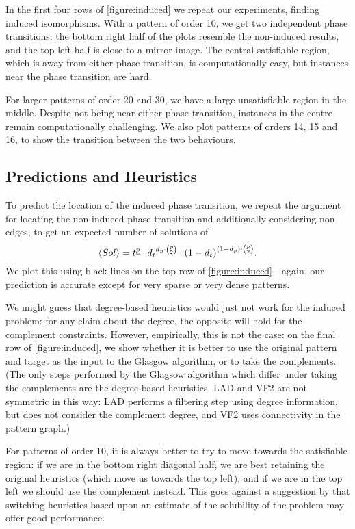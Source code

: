 \documentclass[twoside,11pt]{article}
\newcommand{\citet}[1]{\citeA{#1}}
\begin{document}
In the first four rows of \cref{figure:induced} we repeat our experiments, finding induced
isomorphisms. With a pattern of order 10, we get two independent phase transitions: the bottom right
half of the plots resemble the non-induced results, and the top left half is close to a mirror
image. The central satisfiable region, which is away from either phase transition, is
computationally easy, but instances near the phase transition are hard.

For larger patterns of order 20 and 30, we have a large unsatisfiable region in the middle. Despite
not being near either phase transition, instances in the centre remain computationally challenging.
We also plot patterns of orders 14, 15 and 16, to show the transition between the two behaviours.

\subsection{Predictions and Heuristics}

To predict the location of the induced phase transition, we repeat the argument for locating the
non-induced phase transition and additionally considering non-edges, to get an expected number of
solutions of \[ \langle Sol \rangle = t^{\underline{p}} \cdot {d_t}^{d_p \cdot \binom{p}{2}} \cdot
{(1 - d_{t})}^{(1 - d_{p}) \cdot \binom{p}{2}} \textnormal{.} \] We plot this using black lines on
the top row of \cref{figure:induced}---again, our prediction is accurate except for very sparse or
very dense patterns.

We might guess that degree-based heuristics would just not work for the induced problem: for any
claim about the degree, the opposite will hold for the complement constraints. However, empirically,
this is not the case: on the final row of \cref{figure:induced}, we show whether it is better to use
the original pattern and target as the input to the Glasgow algorithm, or to take the complements.
(The only steps performed by the Glagsow algorithm which differ under taking the complements are
the degree-based heuristics.  LAD and VF2 are not symmetric in this way: LAD performs a filtering
step using degree information, but does not consider the complement degree, and VF2 uses
connectivity in the pattern graph.)

For patterns of order 10, it is always better to try to move towards the satisfiable region: if we
are in the bottom right diagonal half, we are best retaining the original heuristics (which move us
towards the top left), and if we are in the top left we should use the complement instead. This
goes against a suggestion by \citet{Walsh:1998} that switching heuristics based upon an estimate of
the solubility of the problem may offer good performance.
\end{document}
